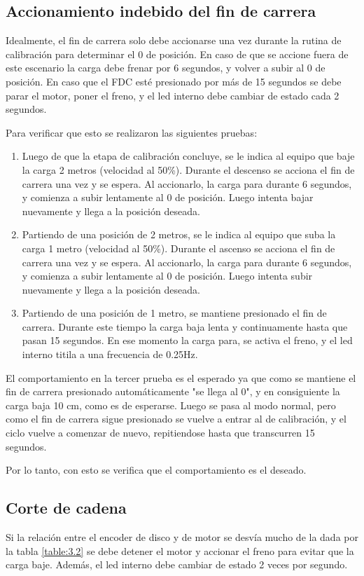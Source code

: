 \subsection{Accionamiento indebido del fin de carrera}
Idealmente, el fin de carrera solo debe accionarse una vez durante la rutina de calibración para determinar el 0 de posición. En caso de que se accione fuera de este escenario la carga debe frenar por 6 segundos, y volver a subir al 0 de posición. En caso que el FDC esté presionado por más de 15 segundos se debe parar el motor, poner el freno, y el led interno debe cambiar de estado cada 2 segundos.

Para verificar que esto se realizaron las siguientes pruebas:
\begin{enumerate}
	\item Luego de que la etapa de calibración concluye, se le indica al equipo que baje la carga 2 metros (velocidad al 50\%). Durante el descenso se acciona el fin de carrera una vez y se espera. Al accionarlo, la carga para durante 6 segundos, y comienza a subir lentamente al 0 de posición. Luego intenta bajar nuevamente y llega a la posición deseada.
	\item Partiendo de una posición de 2 metros, se le indica al equipo que suba la carga 1 metro (velocidad al 50\%). Durante el ascenso se acciona el fin de carrera una vez y se espera. Al accionarlo, la carga para durante 6 segundos, y comienza a subir lentamente al 0 de posición. Luego intenta subir nuevamente y llega a la posición deseada.
	\item Partiendo de una posición de 1 metro, se mantiene presionado el fin de carrera. Durante este tiempo la carga baja lenta y continuamente hasta que pasan 15 segundos. En ese momento la carga para, se activa el freno, y el led interno titila a una frecuencia de 0.25Hz.
\end{enumerate}

El comportamiento en la tercer prueba es el esperado ya que como se mantiene el fin de carrera presionado automáticamente "se llega al 0", y en consiguiente la carga baja 10 cm, como es de esperarse. Luego se pasa al modo normal, pero como el fin de carrera sigue presionado se vuelve a entrar al de calibración, y el ciclo vuelve a comenzar de nuevo, repitiendose hasta que transcurren 15 segundos.

Por lo tanto, con esto se verifica que el comportamiento es el deseado.
	
\subsection{Corte de cadena}
Si la relación entre el encoder de disco y de motor se desvía mucho de la dada por la tabla \ref{table:3.2} se debe detener el motor y accionar el freno para evitar que la carga baje. Además, el led interno debe cambiar de estado 2 veces por segundo.

